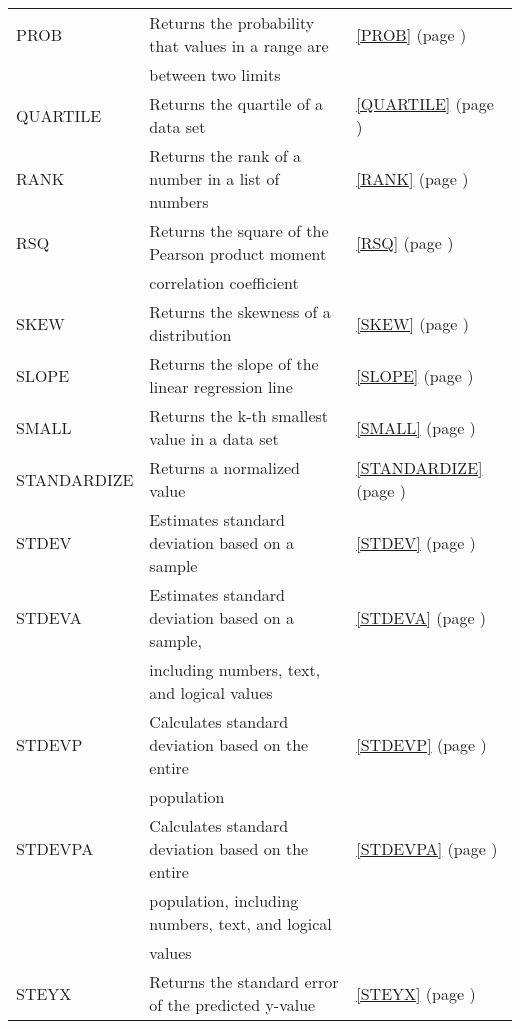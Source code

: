 \begin{center}
\begin{longtable}{l l l }
		PROB  & Returns the probability that values in a range are &  \ref{PROB} (page \pageref{PROB}) \index{Spreadsheet Functions!PROB} \\
		& between two limits &   \\
		QUARTILE & Returns the quartile of a data set &  \ref{QUARTILE} (page \pageref{QUARTILE}) \index{Spreadsheet Functions!QUARTILE} \\
		RANK  & Returns the rank of a number in a list of numbers &  \ref{RANK} (page \pageref{RANK}) \index{Spreadsheet Functions!RANK} \\
		RSQ   & Returns the square of the Pearson product moment &  \ref{RSQ} (page \pageref{RSQ}) \index{Spreadsheet Functions!RSQ} \\
		& correlation coefficient &   \\
		SKEW  & Returns the skewness of a distribution &  \ref{SKEW} (page \pageref{SKEW}) \index{Spreadsheet Functions!SKEW} \\
		SLOPE & Returns the slope of the linear regression line &  \ref{SLOPE} (page \pageref{SLOPE}) \index{Spreadsheet Functions!SLOPE} \\
		SMALL & Returns the k-th smallest value in a data set &  \ref{SMALL} (page \pageref{SMALL}) \index{Spreadsheet Functions!SMALL} \\
		STANDARDIZE & Returns a normalized value &  \ref{STANDARDIZE} (page \pageref{STANDARDIZE}) \index{Spreadsheet Functions!STANDARDIZE} \\
		STDEV & Estimates standard deviation based on a sample &  \ref{STDEV} (page \pageref{STDEV}) \index{Spreadsheet Functions!STDEV} \\
		STDEVA & Estimates standard deviation based on a sample, &  \ref{STDEVA} (page \pageref{STDEVA}) \index{Spreadsheet Functions!STDEVA} \\
		& including numbers, text, and logical values &   \\
		STDEVP & Calculates standard deviation based on the entire &  \ref{STDEVP} (page \pageref{STDEVP}) \index{Spreadsheet Functions!STDEVP} \\
		& population &   \\
		STDEVPA & Calculates standard deviation based on the entire &  \ref{STDEVPA} (page \pageref{STDEVPA}) \index{Spreadsheet Functions!STDEVPA} \\
		& population, including numbers, text, and logical  &   \\
		& values &   \\					
		STEYX & Returns the standard error of the predicted y-value &  \ref{STEYX} (page \pageref{STEYX}) \index{Spreadsheet Functions!STEYX} \\

\end{longtable}
\end{center}
